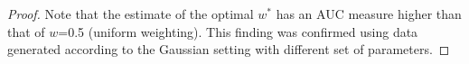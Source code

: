 \documentclass[12pt]{article} %
\begin{document}
\begin{proof}
Note that   the estimate of the optimal $w^{*}$  has  an AUC measure higher than  that of $w$=0.5 (uniform weighting). This finding was confirmed using data generated 
according to  the Gaussian setting with different set of parameters.

\end{proof}
\end{document}
